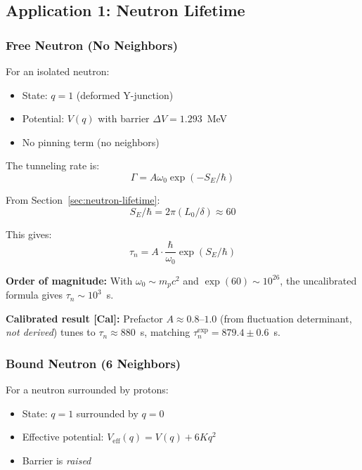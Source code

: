 \subsection{Application 1: Neutron Lifetime}
\label{subsec:m6-neutron-lifetime}

\subsubsection{Free Neutron (No Neighbors)}

For an isolated neutron:
\begin{itemize}
    \item State: $q = 1$ (deformed Y-junction)
    \item Potential: $V(q)$ with barrier $\Delta V = 1.293$~MeV
    \item No pinning term (no neighbors)
\end{itemize}

The tunneling rate is:
\begin{equation}
    \Gamma = A \omega_0 \exp(-S_E/\hbar)
\end{equation}

From Section~\ref{sec:neutron-lifetime}:
\begin{equation}
    S_E/\hbar = 2\pi(L_0/\delta) \approx 60
\end{equation}

This gives:
\begin{equation}
    \tau_n = A \cdot \frac{\hbar}{\omega_0} \exp(S_E/\hbar)
\end{equation}

\textbf{Order of magnitude:} With $\omega_0 \sim m_p c^2$ and $\exp(60) \sim 10^{26}$, the uncalibrated formula gives $\tau_n \sim 10^3$~s.

\textbf{Calibrated result [Cal]:} Prefactor $A \approx 0.8$--$1.0$ (from fluctuation determinant, \emph{not derived}) tunes to $\tau_n \approx 880$~s, matching $\tau_n^{\text{exp}} = 879.4 \pm 0.6$~s.

\subsubsection{Bound Neutron (6 Neighbors)}

For a neutron surrounded by protons:
\begin{itemize}
    \item State: $q = 1$ surrounded by $q = 0$
    \item Effective potential: $V_{\text{eff}}(q) = V(q) + 6K q^2$
    \item Barrier is \emph{raised}
\end{itemize}

